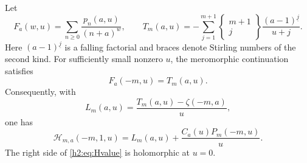 \begin{lemma}
\label{h2:lem:stirling}
Let
\[
 F_a(w,u)=\sum_{n\ge0}\frac{p_n(a,u)}{(n+a)^w},\qquad
 T_m(a,u)=-\sum_{j=1}^{m+1}
   \left\{\begin{matrix}m+1\\j\end{matrix}\right\}
      \frac{(a-1)^{\underline j}}{u+j}.
\]
Here $(a-1)^{\underline j}$ is a falling factorial and braces denote
Stirling numbers of the second kind. For sufficiently small nonzero
$u$, the meromorphic continuation satisfies
\begin{equation}\label{h2:eq:Fnegative}
 F_a(-m,u)=T_m(a,u).
\end{equation}
Consequently, with
\begin{equation}\label{h2:eq:L}
 L_m(a,u)=\frac{T_m(a,u)-\zeta(-m,a)}u,
\end{equation}
one has
\begin{equation}\label{h2:eq:Hvalue}
 \mathcal H_{m,a}(-m,1,u)
   =L_m(a,u)+\frac{C_a(u)P_m(-m,u)}u.
\end{equation}
The right side of \eqref{h2:eq:Hvalue} is holomorphic at $u=0$.
\end{lemma}
